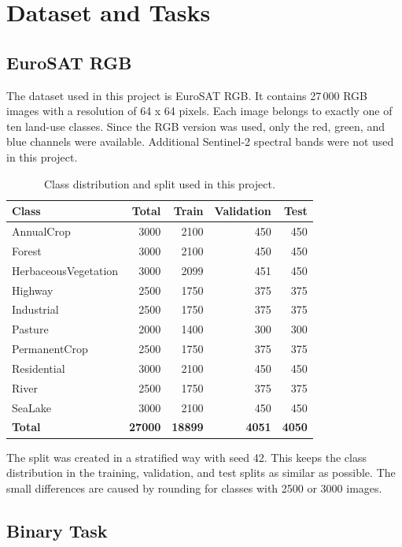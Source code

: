 \section{Dataset and Tasks}

\subsection{EuroSAT RGB}

The dataset used in this project is EuroSAT RGB. It contains 27\,000 RGB images
with a resolution of 64 x 64 pixels. Each image belongs to exactly one of ten
land-use classes. Since the RGB version was used, only the red, green, and blue
channels were available. Additional Sentinel-2 spectral bands were not used in
this project.

\begin{table}[H]
\centering
\caption{Class distribution and split used in this project.}
\label{tab:split}
\begin{tabular}{lrrrr}
\toprule
Class & Total & Train & Validation & Test \\
\midrule
AnnualCrop & 3000 & 2100 & 450 & 450 \\
Forest & 3000 & 2100 & 450 & 450 \\
HerbaceousVegetation & 3000 & 2099 & 451 & 450 \\
Highway & 2500 & 1750 & 375 & 375 \\
Industrial & 2500 & 1750 & 375 & 375 \\
Pasture & 2000 & 1400 & 300 & 300 \\
PermanentCrop & 2500 & 1750 & 375 & 375 \\
Residential & 3000 & 2100 & 450 & 450 \\
River & 2500 & 1750 & 375 & 375 \\
SeaLake & 3000 & 2100 & 450 & 450 \\
\midrule
\textbf{Total} & \textbf{27000} & \textbf{18899} & \textbf{4051} & \textbf{4050} \\
\bottomrule
\end{tabular}
\end{table}

The split was created in a stratified way with seed 42. This keeps the class
distribution in the training, validation, and test splits as similar as
possible. The small differences are caused by rounding for classes with 2500 or
3000 images.

\subsection{Binary Task}

